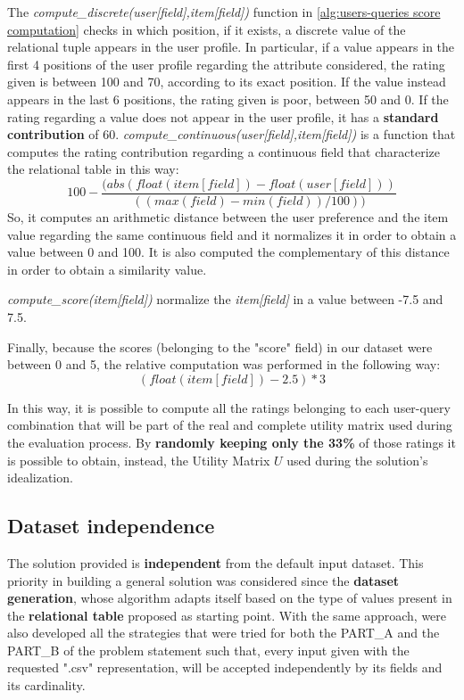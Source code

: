 The \textit{compute\_discrete(user[field],item[field])} function in \ref{alg:users-queries score computation} checks in which position, if it exists, a discrete value of the relational tuple appears in the user profile. In particular, if a value appears in the first 4 positions of the user profile regarding the attribute considered, the rating given is between 100 and 70, according to its exact position. If the value instead appears in the last 6 positions, the rating given is poor, between 50 and 0. If the rating regarding a value does not appear in the user profile, it has a \textbf{standard contribution} of 60.
\textit{compute\_continuous(user[field],item[field])} is a function that computes the rating contribution regarding a continuous field that characterize the relational table in this way:
$$100-\frac{(abs(float(item[field])-float(user[field]))}{((max(field)-min(field))/100))}$$
So, it computes an arithmetic distance between the user preference and the item value regarding the same continuous field and it normalizes it in order to obtain a value between 0 and 100. It is also computed the complementary of this distance in order to obtain a similarity value.

\textit{compute\_score(item[field])} normalize the \textit{item[field]} in a value between -7.5 and 7.5. 

Finally, because the scores (belonging to the "score" field) in our dataset were between 0 and 5, the relative computation was performed in the following way:
$$(float(item[field])-2.5)*3$$

In this way, it is possible to compute all the ratings belonging to each user-query combination that will be part of the real and complete utility matrix used during the evaluation process. By \textbf{randomly keeping only the 33\%} of those ratings it is possible to obtain, instead, the Utility Matrix $U$ used during the solution's idealization.

\subsection{Dataset independence}

The solution provided is \textbf{independent} from the default input dataset.
This priority in building a general solution was considered since the \textbf{dataset generation}, whose algorithm adapts itself based on the type of values present in the \textbf{relational table} proposed as starting point. With the same approach, were also developed all the strategies that were tried for both the PART\_A and the PART\_B of the problem statement such that, every input given with the requested ".csv" representation, will be accepted independently by its fields and its cardinality.


